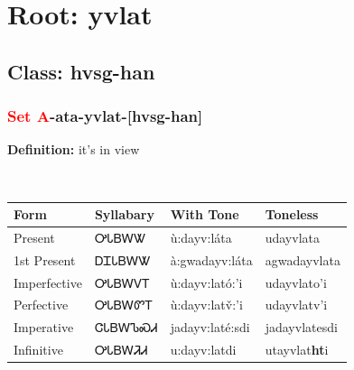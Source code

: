 \needspace{4in}
\section*{Root: yvlat}
\nopagebreak
{}
\needspace{3in}
\subsection*{Class: hvsg-han}
\nopagebreak
\needspace{2in}
\subsubsection*{\textcolor{Red}{Set A}{-}ata{-}\textbf{yvlat}{-}[hvsg-han]}
\nopagebreak
\textbf{Definition: } it{\textquoteright}s in view
\\[0.5em]
\begin{tabularx}{\textwidth}{l X X X}%
\toprule%
\textbf{Form}&\textbf{Syllabary}&\textbf{With Tone}&\textbf{Toneless}\\%
\midrule%
Present&ᎤᏓᏴᎳᏔ&ù:dayv:láta&udayvlata\\%
1st Present&ᎠᏆᏓᏴᎳᏔ&à:gwadayv:láta&agwadayvlata\\%
Imperfective&ᎤᏓᏴᎳᏙᎢ&ù:dayv:lató:’i&udayvlato{\textquoteright}i\\%
Perfective&ᎤᏓᏴᎳᏛᎢ&ù:dayv:latv̌:’i&udayvlatv{\textquoteright}i\\%
Imperative&ᏣᏓᏴᎳᏖᏍᏗ&jadayv:laté:sdi&jadayvlatesdi\\%
Infinitive&ᎤᏓᏴᎳᏘᏗ&u:dayv:latdi&utayvlat\textbf{ht}i\\%
\bottomrule%
\end{tabularx}
\\[1em]